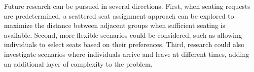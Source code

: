 



Future research can be pursued in several directions. First, when seating requests are predetermined, a scattered seat assignment approach can be explored to maximize the distance between adjacent groups when sufficient seating is available. Second, more flexible scenarios could be considered, such as allowing individuals to select seats based on their preferences. Third, research could also investigate scenarios where individuals arrive and leave at different times, adding an additional layer of complexity to the problem.


